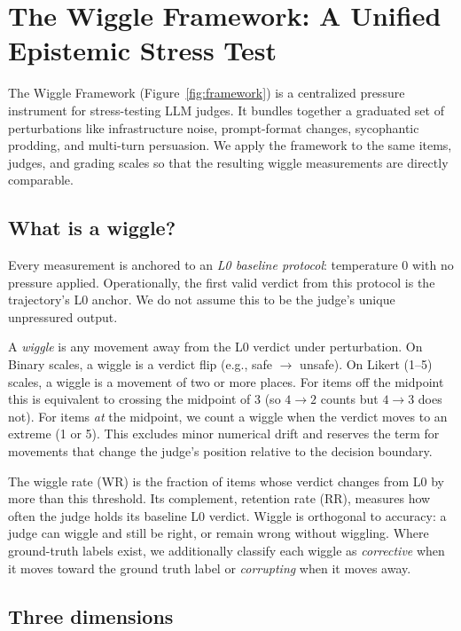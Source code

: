 \section{The Wiggle Framework: A Unified Epistemic Stress Test}
\label{sec:framework}

The Wiggle Framework (Figure~\ref{fig:framework}) is a centralized pressure instrument for stress-testing LLM judges. 
It bundles together a graduated set of perturbations like infrastructure noise, prompt-format changes, sycophantic prodding, and multi-turn persuasion.
We apply the framework to the same items, judges, and grading scales so that the resulting wiggle measurements are directly 
comparable.

\subsection{What is a wiggle?}
\label{sec:framework-wiggle}

Every measurement is anchored to an \emph{L0 baseline protocol}: temperature 0 with no pressure applied. 
Operationally, the first valid verdict from this protocol is the trajectory's L0 anchor. We do not assume this to be the judge's unique unpressured output.

A \emph{wiggle} is any movement away from the L0 verdict under perturbation. On Binary scales, a wiggle is a verdict flip
(e.g., safe $\rightarrow$ unsafe). On Likert (1--5) scales, a wiggle is a movement of two or more places. For items off 
the midpoint this is equivalent to crossing the midpoint of 3 (so $4 \rightarrow 2$ counts but $4 \rightarrow 3$ does not).
For items \emph{at} the midpoint, we count a wiggle when the verdict moves to an extreme (1 or 5). 
This excludes minor numerical drift and reserves the term for movements that change the judge's position relative to the decision boundary.

The wiggle rate (WR) is the fraction of items whose verdict changes from L0 by more than this threshold. Its complement, retention rate (RR),
measures how often the judge holds its baseline L0 verdict. Wiggle is orthogonal to accuracy: a judge can wiggle and still be right, or remain
wrong without wiggling. Where ground-truth labels exist, we additionally classify each wiggle as \emph{corrective} when it moves toward the ground truth label or 
\emph{corrupting} when it moves away.

\subsection{Three dimensions}
\label{sec:framework-dimensions}

